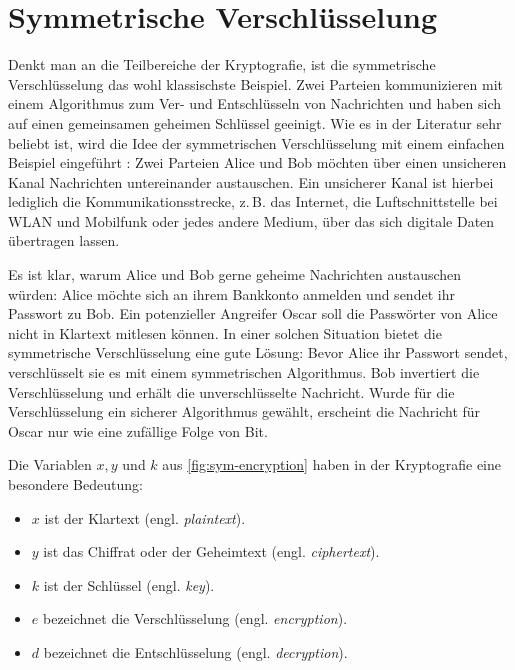 \section{Symmetrische Verschlüsselung}
Denkt man an die Teilbereiche der Kryptografie, ist die symmetrische Verschlüsselung
das wohl klassischste Beispiel. Zwei Parteien kommunizieren mit einem
Algorithmus zum Ver- und Entschlüsseln von Nachrichten und haben sich auf einen
gemeinsamen geheimen Schlüssel geeinigt. Wie es in der Literatur sehr beliebt ist,
wird die Idee der symmetrischen Verschlüsselung
mit einem einfachen Beispiel eingeführt \parencite[4-6]{BOOK:crypto}:
Zwei Parteien Alice und Bob möchten über einen unsicheren Kanal Nachrichten untereinander austauschen.
Ein unsicherer Kanal ist hierbei lediglich die Kommunikationsstrecke,
z.\,B. das Internet, die Luftschnittstelle bei WLAN und Mobilfunk
oder jedes andere Medium, über das sich digitale Daten übertragen lassen.
\newpage



\noindent
Es ist klar, warum Alice und Bob gerne geheime Nachrichten austauschen würden:
Alice möchte sich an ihrem
Bankkonto anmelden und sendet ihr Passwort zu Bob. Ein potenzieller Angreifer Oscar
soll die Passwörter von Alice nicht in Klartext mitlesen können.
In einer solchen Situation bietet die symmetrische Verschlüsselung eine gute Lösung:
Bevor Alice ihr Passwort sendet, verschlüsselt sie es mit einem symmetrischen Algorithmus.
Bob invertiert die Verschlüsselung und erhält die unverschlüsselte Nachricht. Wurde für
die Verschlüsselung ein sicherer Algorithmus gewählt, erscheint die Nachricht für Oscar nur wie
eine zufällige Folge von Bit.



\noindent
Die Variablen $x, y$ und $k$ aus \autoref{fig:sym-encryption} haben in der
Kryptografie eine besondere Bedeutung:

\begin{itemize}
  \item $x$ ist der Klartext (engl. \textit{plaintext}).
  \item $y$ ist das Chiffrat oder der Geheimtext (engl. \textit{ciphertext}).
  \item $k$ ist der Schlüssel (engl. \textit{key}).
  \item $e$ bezeichnet die Verschlüsselung (engl. \textit{encryption}).
  \item $d$ bezeichnet die Entschlüsselung (engl. \textit{decryption}).
\end{itemize}

